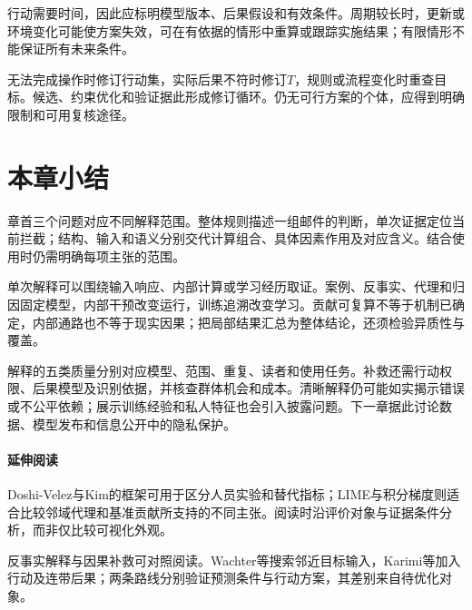 行动需要时间，因此应标明模型版本、后果假设和有效条件。周期较长时，更新或环境变化可能使方案失效，可在有依据的情形中重算或跟踪实施结果；有限情形不能保证所有未来条件。

无法完成操作时修订行动集，实际后果不符时修订$T$，规则或流程变化时重查目标。候选、约束优化和验证据此形成修订循环。仍无可行方案的个体，应得到明确限制和可用复核途径。

\section{本章小结}
\label{sec:interpretability-summary}

章首三个问题对应不同解释范围。整体规则描述一组邮件的判断，单次证据定位当前拦截；结构、输入和语义分别交代计算组合、具体因素作用及对应含义。结合使用时仍需明确每项主张的范围。

单次解释可以围绕输入响应、内部计算或学习经历取证。案例、反事实、代理和归因固定模型，内部干预改变运行，训练追溯改变学习。贡献可复算不等于机制已确定，内部通路也不等于现实因果；把局部结果汇总为整体结论，还须检验异质性与覆盖。

解释的五类质量分别对应模型、范围、重复、读者和使用任务。补救还需行动权限、后果模型及识别依据，并核查群体机会和成本。清晰解释仍可能如实揭示错误或不公平依赖；展示训练经验和私人特征也会引入披露问题。下一章据此讨论数据、模型发布和信息公开中的隐私保护。

\paragraph{延伸阅读}

Doshi-Velez与Kim的框架可用于区分人员实验和替代指标；LIME与积分梯度则适合比较邻域代理和基准贡献所支持的不同主张。阅读时沿评价对象与证据条件分析，而非仅比较可视化外观。

反事实解释与因果补救可对照阅读。Wachter等搜索邻近目标输入，Karimi等加入行动及连带后果；两条路线分别验证预测条件与行动方案，其差别来自待优化对象。

